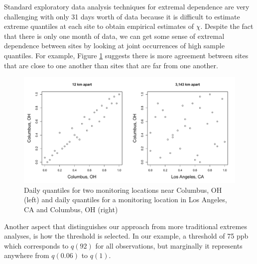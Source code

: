 \documentclass[useAMS,usenatbib,referee]{biom}
\begin{document}
Standard exploratory data analysis techniques for extremal dependence are very challenging with only 31 days worth of data because it is difficult to estimate extreme quantiles at each site to obtain empirical estimates of $\chi$.
Despite the fact that there is only one month of data, we can get some sense of extremal dependence between sites by looking at joint occurrences of high sample quantiles.
For example, Figure \ref{fig:bivariateozone} suggests there is more agreement between sites that are close to one another than sites that are far from one another.
\begin{figure}
  \centering
  \includegraphics[width=\linewidth]{plots/daily-quantiles-ozone.pdf}
  \caption{Daily quantiles for two monitoring locations near Columbus, OH (left) and daily quantiles for a monitoring location in Los Angeles, CA and Columbus, OH (right)}
  \label{fig:bivariateozone}
\end{figure}
Another aspect that distinguishes our approach from more traditional extremes analyses, is how the threshold is selected.
In our example, a threshold of 75 ppb which corresponds to $q(92)$ for all observations, but marginally it represents anywhere from $q(0.06)$ to $q(1)$.

\end{document}
